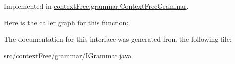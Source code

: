 Implemented in \hyperlink{classcontext_free_1_1grammar_1_1_context_free_grammar_a922203e2db862d2a8ab31e8e7736273b}{context\-Free.\-grammar.\-Context\-Free\-Grammar}.



Here is the caller graph for this function\-:




The documentation for this interface was generated from the following file\-:\begin{DoxyCompactItemize}
\item 
src/context\-Free/grammar/I\-Grammar.\-java\end{DoxyCompactItemize}
